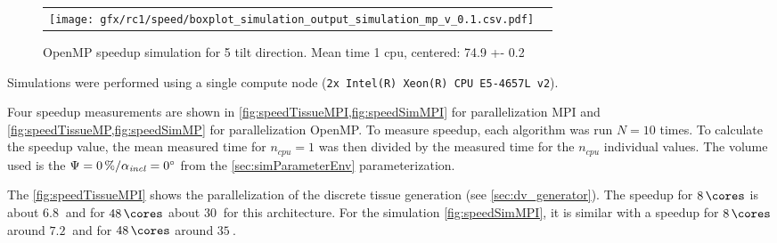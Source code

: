 %
\begin{figure}[!t]
\centering
%
\begin{lrbox}{\newtable}
\end{lrbox}
%
\begin{tabular}{cc}
\begin{minipage}{0.6\textwidth}
\texttt{[image: gfx/rc1/speed/boxplot\_simulation\_output\_simulation\_mp\_v\_0.1.csv.pdf]}
\end{minipage}
&
\begin{minipage}{0.25\textwidth}
\usebox{\newtable}
\end{minipage}
\end{tabular}
\caption{\ac{OpenMP} speedup simulation for 5 tilt direction. Mean time 1 cpu, centered: 74.9 +- 0.2}
\label{fig:speedSimMP}
\end{figure}
%
Simulations were performed using a single compute node (\texttt{2x Intel(R) Xeon(R) CPU E5-4657L v2}).
\par
%
Four speedup measurements are shown in \cref{fig:speedTissueMPI,fig:speedSimMPI} for parallelization \ac{MPI} and \cref{fig:speedTissueMP,fig:speedSimMP} for parallelization \ac{OpenMP}.
To measure speedup, each algorithm was run $N=10$ times.
To calculate the speedup value, the mean measured time for $n_\mathit{cpu}=1$ was then divided by the measured time for the $n_\mathit{cpu}$ individual values.
The volume used is the $\textnormal{$\Psi$}=\SI{0}{\percent} / \textnormal{$\alpha_{\mathit{incl}}$}=\SI{0}{\degree}$ from the \cref{sec:simParameterEnv} parameterization.
\par
%
The \cref{fig:speedTissueMPI} shows the parallelization of the discrete tissue generation (see \cref{sec:dv_generator}).
The speedup for $\SI{8}{\cores}$ is about $\SI{6.8}{}$ and for $\SI{48}{\cores}$ about $\SI{30}{}$ for this architecture.
For the simulation \cref{fig:speedSimMPI}, it is similar with a speedup for $\SI{8}{\cores}$ around $\SI{7.2}{}$ and for $\SI{48}{\cores}$ around $\SI{35}{}$.
